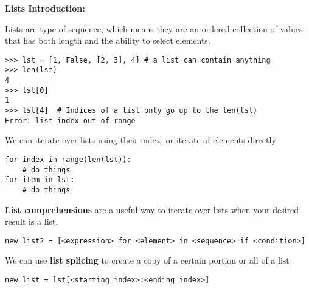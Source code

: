 \textbf{Lists Introduction:}

Lists are type of sequence, which means they are an ordered collection of values that has both length and the ability to select elements.

\begin{lstlisting}
>>> lst = [1, False, [2, 3], 4] # a list can contain anything
>>> len(lst)
4
>>> lst[0]
1
>>> lst[4] 	# Indices of a list only go up to the len(lst)
Error: list index out of range
\end{lstlisting}

We can iterate over lists using their index, or iterate of elements directly

\begin{lstlisting}
for index in range(len(lst)):
	# do things
for item in lst:
	# do things
\end{lstlisting}

\textbf{List comprehensions} are a useful way to iterate over lists when your desired result is a list.
\begin{lstlisting}
new_list2 = [<expression> for <element> in <sequence> if <condition>]
\end{lstlisting}

We can use \textbf{list splicing} to create a copy of a certain portion or all of a list

\begin{lstlisting}
new_list = lst[<starting index>:<ending index>]
\end{lstlisting}
